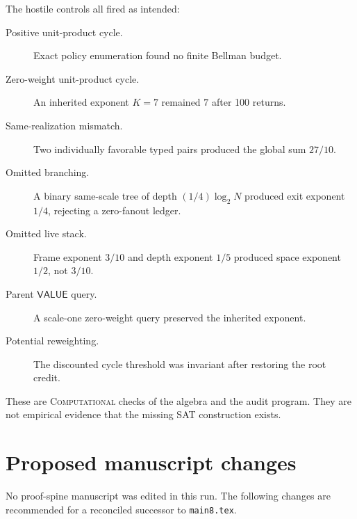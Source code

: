 \documentclass[11pt]{article}
\newcommand{\VALUE}{\mathsf{VALUE}}
\begin{document}
The hostile controls all fired as intended:
\begin{description}
\item[Positive unit-product cycle.]
Exact policy enumeration found no finite Bellman budget.
\item[Zero-weight unit-product cycle.]
An inherited exponent \(K=7\) remained \(7\) after 100 returns.
\item[Same-realization mismatch.]
Two individually favorable typed pairs produced the global sum \(27/10\).
\item[Omitted branching.]
A binary same-scale tree of depth \((1/4)\log_2N\) produced exit exponent
\(1/4\), rejecting a zero-fanout ledger.
\item[Omitted live stack.]
Frame exponent \(3/10\) and depth exponent \(1/5\) produced space exponent
\(1/2\), not \(3/10\).
\item[Parent \(\VALUE\) query.]
A scale-one zero-weight query preserved the inherited exponent.
\item[Potential reweighting.]
The discounted cycle threshold was invariant after restoring the root credit.
\end{description}

These are \textsc{Computational} checks of the algebra and the audit program.
They are not empirical evidence that the missing SAT construction exists.

\section{Proposed manuscript changes}

No proof-spine manuscript was edited in this run.  The following changes are
recommended for a reconciled successor to \texttt{main8.tex}.
\end{document}
